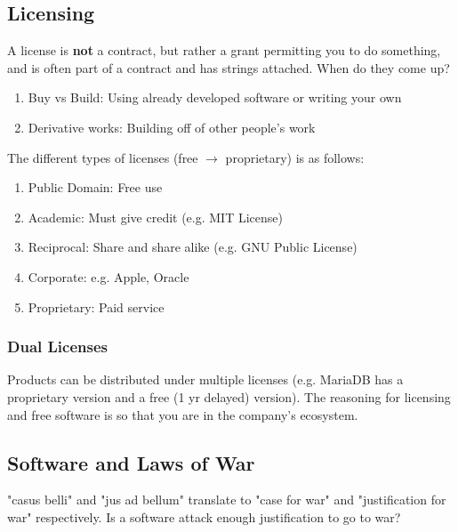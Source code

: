 \documentclass[13pt]{article}
\begin{document}
\subsection{Licensing}
A license is \textbf{not} a contract, but rather a grant permitting you to do something, and is often part of a contract and has strings attached. When do they come up?
\begin{enumerate}[label=]
\item Buy vs Build: Using already developed software or writing your own
\item Derivative works: Building off of other people's work
\end{enumerate}
The different types of licenses (free $\rightarrow$ proprietary) is as follows:
\begin{enumerate}[label=]
\item Public Domain: Free use
\item Academic: Must give credit (e.g. MIT License)
\item Reciprocal: Share and share alike (e.g. GNU Public License)
\item Corporate: e.g. Apple, Oracle
\item Proprietary: Paid service
\end{enumerate}

\subsubsection{Dual Licenses}
Products can be distributed under multiple licenses (e.g. MariaDB has a proprietary version and a free (1 yr delayed) version). The reasoning for licensing and free software is so that you are in the company's ecosystem.

\subsection{Software and Laws of War}
"casus belli" and "jus ad bellum" translate to "case for war" and "justification for war" respectively. Is a software attack enough justification to go to war?
\end{document}

